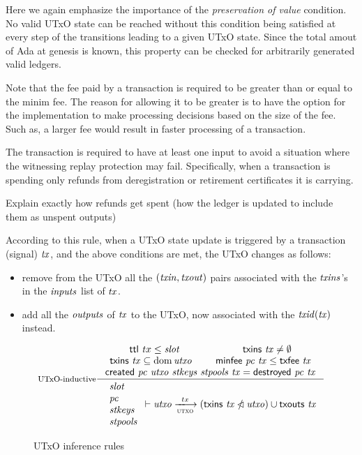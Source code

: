 \documentclass[11pt,a4paper]{article}
\newcommand{\txins}[1]{\fun{txins}~ \var{#1}}
\newcommand{\txouts}[1]{\fun{txouts}~ \var{#1}}
\newcommand{\ttl}[1]{\fun{ttl}~ \var{#1}}
\newcommand{\created}[5]{\fun{created}~ \var{#1}~ \var{#2}~ \var{#3}~ \var{#4}~ \var{#5}}
\newcommand{\destroyed}[2]{\fun{destroyed}~ \var{#1}~ \var{#2}}
\newcommand{\txfee}[1]{\fun{txfee}~ \var{#1}}
\newcommand{\minfee}[2]{\fun{minfee}~ \var{#1}~ \var{#2}}
\theoremstyle{definition}
\theoremstyle{definition}
\begin{document}
Here we again emphasize the importance of the \textit{preservation of value}
condition. No valid UTxO state can be reached without this condition
being satisfied at every step of the transitions leading to a given UTxO state.
Since the total amout of Ada at genesis is known, this property can be
checked for arbitrarily generated valid ledgers.

Note that the fee paid by a transaction is required to be greater than or
equal to the minim fee. The reason for allowing it to be greater is to have
the option for the implementation to make processing decisions based on the
size of the fee. Such as, a larger fee would result in faster processing of
a transaction.

The transaction is required to have at least one input to avoid a situation
where the witnessing replay protection may fail. Specifically, when a transaction is
spending only refunds from deregistration or retirement certificates it is
carrying.

\begin{todo}
  Explain exactly how refunds get spent (how the ledger is updated to include
  them as unspent outputs)
\end{todo}

According to this rule, when a UTxO state update is triggered by a
transaction (signal) $\mathit{tx}$, and the above conditions are met, the UTxO
changes as follows:

\begin{itemize}
\item remove from the UTxO all the $(\mathit{txin}, \mathit{txout})$ pairs
associated with the $\mathit{txins}$'s in the $\mathit{inputs}$ list of $\mathit{tx}$.
\item add all the $\mathit{outputs}$ of $\mathit{tx}$ to the
UTxO, now associated with the $\mathit{txid}(\mathit{tx})$ instead.
\end{itemize}


\begin{figure}
  \begin{equation}\label{eq:utxo-inductive}
    \inference[UTxO-inductive]
    { \ttl tx \leq \var{slot}
      & \txins{tx} \neq \emptyset
      \\
      \txins{tx} \subseteq \dom \var{utxo}
      & \minfee{pc}{tx} \leq \txfee{tx}
      \\
      \created{pc}{utxo}{stkeys}{stpools}{tx} = \destroyed{pc}{tx}
    }
    {
      \begin{array}{l}
        \var{slot}\\
        \var{pc}\\
        \var{stkeys}\\
        \var{stpools}\\
      \end{array}
      \vdash \var{utxo} \trans{utxo}{tx}
      (\txins{tx} \subtractdom \var{utxo}) \cup \txouts{tx}
    }
  \end{equation}
  \caption{UTxO inference rules}
  \label{fig:rules:utxo}
\end{figure}
\end{document}
